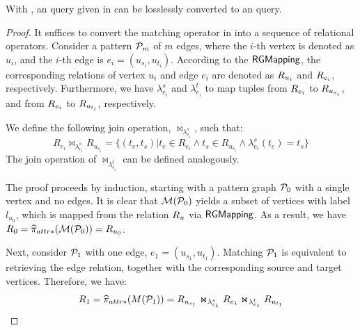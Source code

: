\begin{lemma}
    \label{lem:spjm-to-spj}
    With \rgmapping, an \spjm query given in  can be losslessly converted to an \spj query.
\end{lemma}
\begin{proof}
    It suffices to convert the matching operator in  into a sequence of relational operators. Consider a pattern $\mathcal{P}_m$ of $m$ edges, where the $i$-th vertex is denoted as $u_i$, and the $i$-th edge is $e_i = (u_{s_i}, u_{t_i})$. According to the ${\mathsf{RGMapping}}$, the corresponding relations of vertex $u_i$ and edge $e_i$ are denoted as ${R_{u_i}}$ and ${R_{e_i}}$, respectively. Furthermore, we have $\lambda_{e_i}^s$ and $\lambda_{e_i}^t$ to map tuples from ${R_{e_i}}$ to ${R_{u_{s_i}}}$, and from ${R_{e_i}}$ to ${R_{u_{t_i}}}$, respectively.

We define the following join operation, $\Join_{\lambda_{e_i}^s}$, such that:
\[ R_{e_i} \Join_{\lambda_{e_i}^s} R_{u_{s_i}} = \{(t_e, t_s) | t_e \in R_{e_i} \land t_s \in R_{u_{s_i}} \land \lambda_{e_i}^s(t_e) = t_s\} \]
The join operation of $\Join_{\lambda_{e_i}^t}$ can be defined analogously.

The proof proceeds by induction, starting with a pattern graph $\mathcal{P}_0$ with a single vertex and no edges. It is clear that $\mathcal{M}(\mathcal{P}_0)$ yields a subset of vertices with label $l_{u_0}$, which is mapped from the relation ${R_{u}}$ via ${\mathsf{RGMapping}}$. As a result, we have $R_0 = \widehat{\pi}_{attr*}(\mathcal{M}(\mathcal{P}_0)) = {R_{u_0}}$.

Next, consider $\mathcal{P}_1$ with one edge, $e_1 = (u_{s_1}, u_{t_1})$. Matching $\mathcal{P}_1$ is equivalent to retrieving the edge relation, together with the corresponding source and target vertices. Therefore, we have:
\[ R_1 = \widehat{\pi}_{attr*}(M(\mathcal{P}_1)) = {R_{u_{s_1}}} \Join_{\lambda_{e_1}^s} {R_{e_1}} \Join_{\lambda_{e_1}^t} {R_{u_{t_1}}} \]


\end{proof}
